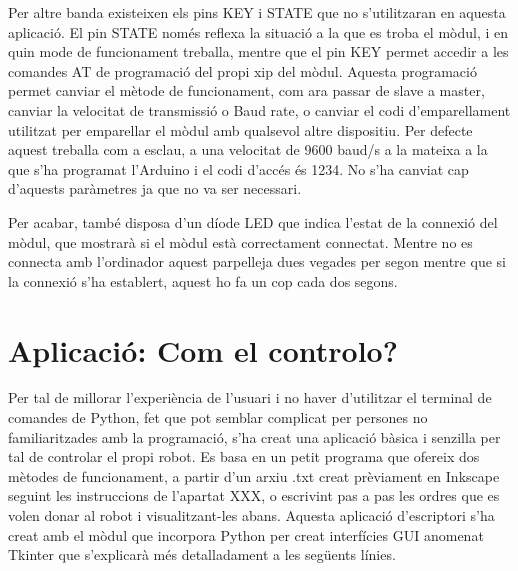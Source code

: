 Per altre banda existeixen els pins KEY i STATE que no s’utilitzaran en aquesta aplicació. El pin STATE només reflexa la situació a la que es troba el mòdul, i en quin mode de funcionament treballa, mentre que el pin KEY permet accedir a les comandes AT de programació del propi xip del mòdul. Aquesta programació permet canviar el mètode de funcionament, com ara passar de slave a master, canviar la velocitat de transmissió o Baud rate, o canviar el codi d’emparellament utilitzat per emparellar el mòdul amb qualsevol altre dispositiu. Per defecte aquest treballa com a esclau, a una velocitat de 9600 baud/s a la mateixa a la que s’ha programat l’Arduino i el codi d’accés és 1234. No s’ha canviat cap d’aquests paràmetres ja que no va ser necessari. 

Per acabar, també disposa d’un díode LED que indica l’estat de la connexió del mòdul, que mostrarà si el mòdul està correctament connectat. Mentre no es connecta amb l’ordinador aquest parpelleja dues vegades per segon mentre que si la connexió s’ha establert,  aquest ho fa un cop cada dos segons. 


\section{Aplicació: Com el controlo?}

Per tal de millorar l’experiència de l’usuari i no haver d’utilitzar el terminal de comandes de Python, fet que pot semblar complicat per persones no familiaritzades amb la programació, s’ha creat una aplicació bàsica i senzilla per tal de controlar el propi robot. Es basa en un petit programa que ofereix dos mètodes de funcionament, a partir d’un arxiu .txt creat prèviament en Inkscape seguint les instruccions de l’apartat XXX, o escrivint pas a pas les ordres que es volen donar al robot i visualitzant-les abans.
Aquesta aplicació d’escriptori s’ha creat amb el mòdul que incorpora Python per creat interfícies GUI anomenat Tkinter que s’explicarà més detalladament a les següents línies. 

